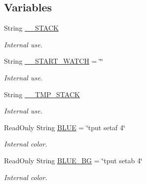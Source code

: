 \subsection*{Variables}
\begin{DoxyCompactItemize}
\item 
\mbox{\label{bsfl_8sh_a7270949dc118d00cf1a520a79ba18f45}} 
String \hyperlink{bsfl_8sh_a7270949dc118d00cf1a520a79ba18f45}{\+\_\+\+\_\+\+S\+T\+A\+CK}
\begin{DoxyCompactList}\small\item\em Internal use. \end{DoxyCompactList}\item 
\mbox{\label{bsfl_8sh_ab486f2c0e1e249077cf12fb5b4f671c3}} 
String \hyperlink{bsfl_8sh_ab486f2c0e1e249077cf12fb5b4f671c3}{\+\_\+\+\_\+\+S\+T\+A\+R\+T\+\_\+\+W\+A\+T\+CH} = \char`\"{}\char`\"{}
\begin{DoxyCompactList}\small\item\em Internal use. \end{DoxyCompactList}\item 
\mbox{\label{bsfl_8sh_ae3524aa38163aa54e5e01198fbc23474}} 
String \hyperlink{bsfl_8sh_ae3524aa38163aa54e5e01198fbc23474}{\+\_\+\+\_\+\+T\+M\+P\+\_\+\+S\+T\+A\+CK}
\begin{DoxyCompactList}\small\item\em Internal use. \end{DoxyCompactList}\item 
\mbox{\label{bsfl_8sh_a6b317f511e4605122591a00ca0fb1659}} 
Read\+Only String \hyperlink{bsfl_8sh_a6b317f511e4605122591a00ca0fb1659}{B\+L\+UE} = \char`\"{}tput setaf 4\char`\"{}
\begin{DoxyCompactList}\small\item\em Internal color. \end{DoxyCompactList}\item 
\mbox{\label{bsfl_8sh_a04e6786c68df0509632f84d83e31b3a8}} 
Read\+Only String \hyperlink{bsfl_8sh_a04e6786c68df0509632f84d83e31b3a8}{B\+L\+U\+E\+\_\+\+BG} = \char`\"{}tput setab 4\char`\"{}
\begin{DoxyCompactList}\small\item\em Internal color. \end{DoxyCompactList}\item 

\end{DoxyCompactItemize}
